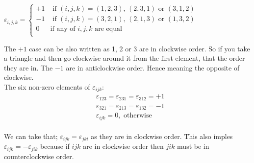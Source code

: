 \documentclass{article}
\newcommand{\e}{\varepsilon}
\newcommand{\at}{\e_{i, j, k}}
\begin{document}
$\at = \begin{cases}
  +1 & \text{ if } (i, j, k) = (1, 2, 3),\, (2, 3, 1) \text{ or } (3, 1, 2)\\
  -1 & \text{ if } (i, j, k) = (3, 2, 1),\, (2, 1, 3) \text{ or } (1, 3, 2)\\
  0 & \text{if any of } i, j, k \text{ are equal} \\
\end{cases}$
\begin{figure}[H]
  \centering
{}
\end{figure}
The $+1$ case can be also written as 1, 2 or 3 are in clockwise order. So if you take a triangle and then go clockwise around it from the first element, that the order they are in. The $-1$ are in anticlockwise order. Hence meaning the opposite of clockwise.\\

The six non-zero elements of $\e_{ijk}$:
\begin{align*}
  &\e_{123} = \e_{231} = \e_{312} = +1\\
  &\e_{321} = \e_{213} = \e_{132} = -1 \\
  &\e_{ijk} = 0, \text{ otherwise} \\
\end{align*}

We can take that; $\e_{ijk} = \e_{jki} $ as they are in clockwise order. This also imples $\e_{ijk} = - \e_{jik}$ because if $ijk $ are in clockwise order then $jik$ must be in counterclockwise order.
\end{document}

